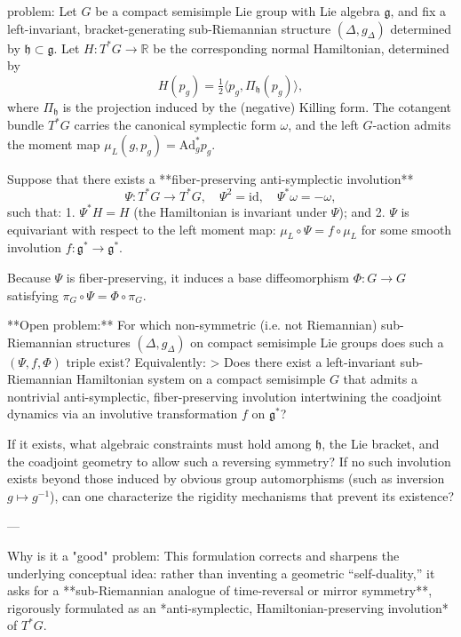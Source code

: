 problem:  
Let \( G \) be a compact semisimple Lie group with Lie algebra \( \mathfrak{g} \), and fix a left-invariant, bracket-generating sub-Riemannian structure \( (\Delta,g_\Delta) \) determined by \( \mathfrak{h}\subset \mathfrak{g} \).  
Let \( H:T^*G\to\mathbb{R} \) be the corresponding normal Hamiltonian, determined by  
\[
H(p_g)=\tfrac12\langle p_g,\Pi_{\mathfrak{h}}(p_g)\rangle,
\]
where \( \Pi_{\mathfrak{h}} \) is the projection induced by the (negative) Killing form.  
The cotangent bundle \( T^*G \) carries the canonical symplectic form \(\omega\), and the left \(G\)-action admits the moment map \(\mu_L(g,p_g)=\mathrm{Ad}^*_g p_g\).

Suppose that there exists a **fiber-preserving anti-symplectic involution**  
\[
\Psi:T^*G\to T^*G, \quad \Psi^2=\mathrm{id}, \quad \Psi^*\omega=-\omega,
\]
such that:
1. \(\Psi^*H = H\) (the Hamiltonian is invariant under \(\Psi\)); and  
2. \(\Psi\) is equivariant with respect to the left moment map:  
   \(\mu_L\circ \Psi = f \circ \mu_L\)  
   for some smooth involution \(f:\mathfrak{g}^*\to \mathfrak{g}^*\).

Because \(\Psi\) is fiber-preserving, it induces a base diffeomorphism \(\Phi:G\to G\) satisfying \(\pi_G\circ \Psi = \Phi\circ \pi_G\).

**Open problem:**  
For which non-symmetric (i.e. not Riemannian) sub-Riemannian structures \( (\Delta,g_\Delta) \) on compact semisimple Lie groups does such a \((\Psi,f,\Phi)\) triple exist?  
Equivalently:  
> Does there exist a left-invariant sub-Riemannian Hamiltonian system on a compact semisimple \(G\) that admits a nontrivial anti-symplectic, fiber-preserving involution intertwining the coadjoint dynamics via an involutive transformation \(f\) on \(\mathfrak{g}^*\)?  

If it exists, what algebraic constraints must hold among \(\mathfrak{h}\), the Lie bracket, and the coadjoint geometry to allow such a reversing symmetry?  
If no such involution exists beyond those induced by obvious group automorphisms (such as inversion \(g\mapsto g^{-1}\)), can one characterize the rigidity mechanisms that prevent its existence?

---

Why is it a "good" problem:  
This formulation corrects and sharpens the underlying conceptual idea: rather than inventing a geometric “self-duality,” it asks for a **sub-Riemannian analogue of time-reversal or mirror symmetry**, rigorously formulated as an *anti-symplectic, Hamiltonian-preserving involution* of \(T^*G\).


